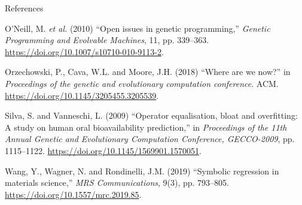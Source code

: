 \documentclass[
  ignorenonframetext,
]{beamer}
\newlength{\cslhangindent}
\newlength{\cslentryspacingunit} %
\newenvironment{CSLReferences}[2] %
 {%
  \setlength{\parindent}{0pt}
  \ifodd #1
  \let\oldpar\par
  \def\par{\hangindent=\cslhangindent\oldpar}
  \fi
  \setlength{\parskip}{#2\cslentryspacingunit}
 }%
 {}
\begin{document}
\begin{frame}[allowframebreaks]{References}
\begin{CSLReferences}{0}{0}
\leavevmode{}%
O'Neill, M. \emph{et al.} (2010) {``Open issues in genetic
programming,''} \emph{Genetic Programming and Evolvable Machines}, 11,
pp. 339--363. \url{https://doi.org/10.1007/s10710-010-9113-2}.

\leavevmode{}%
Orzechowski, P., Cava, W.L. and Moore, J.H. (2018) {``Where are we
now?''} in \emph{Proceedings of the genetic and evolutionary computation
conference}. {ACM}. \url{https://doi.org/10.1145/3205455.3205539}.

\leavevmode{}%
Silva, S. and Vanneschi, L. (2009) {``Operator equalisation, bloat and
overfitting: A study on human oral bioavailability prediction,''} in
\emph{Proceedings of the 11th Annual Genetic and Evolutionary
Computation Conference, GECCO-2009}, pp. 1115--1122.
\url{https://doi.org/10.1145/1569901.1570051}.

\leavevmode{}%
Wang, Y., Wagner, N. and Rondinelli, J.M. (2019) {``Symbolic regression
in materials science,''} \emph{MRS Communications}, 9(3), pp. 793--805.
\url{https://doi.org/10.1557/mrc.2019.85}.

\end{CSLReferences}
\end{frame}
\end{document}

